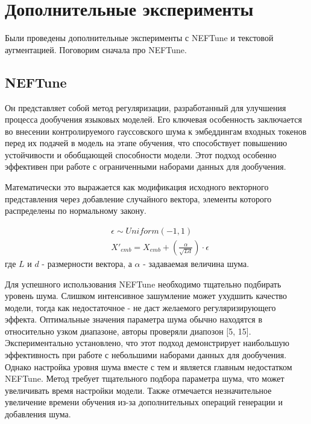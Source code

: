 \section{Дополнительные эксперименты}

Были проведены дополнительные эксперименты с NEFTune\cite{jain2023neftune} и текстовой аугментацией.
Поговорим сначала про NEFTune.

\subsection{NEFTune}
Он представляет собой метод регуляризации, разработанный для улучшения процесса дообучения языковых моделей.
Его ключевая особенность заключается во внесении контролируемого гауссовского шума к эмбеддингам входных токенов перед их подачей в модель на этапе обучения, что способствует повышению устойчивости и обобщающей способности модели.
Этот подход особенно эффективен при работе с ограниченными наборами данных для дообучения.

Математически это выражается как модификация исходного векторного представления через добавление случайного вектора, элементы которого распределены по нормальному закону.

\begin{equation}
  \begin{aligned}
    &\epsilon \sim Uniform(-1, 1) \\
    &X'_{emb} = X_{emb} + (\frac{\alpha}{\sqrt{Ld}})\cdot\epsilon  
  \end{aligned}
  \label{eq:neftune}
\end{equation}
где $L$ и $d$ - размерности вектора, а $\alpha$ - задаваемая величина шума.

Для успешного использования NEFTune необходимо тщательно подбирать уровень шума.
Слишком интенсивное зашумление может ухудшить качество модели, тогда как недостаточное - не даст желаемого регуляризирующего эффекта.
Оптимальные значения параметра шума обычно находятся в относительно узком диапазоне, авторы проверяли диапозон [5, 15].
Экспериментально установлено, что этот подход демонстрирует наибольшую эффективность при работе с небольшими наборами данных для дообучения.
Однако настройка уровня шума вместе с тем и является главным недостатком NEFTune.
Метод требует тщательного подбора параметра шума, что может увеличивать время настройки модели.
Также отмечается незначительное увеличение времени обучения из-за дополнительных операций генерации и добавления шума.

